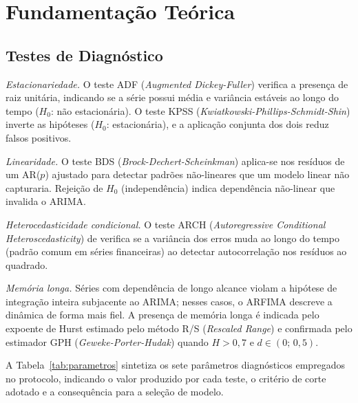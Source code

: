 \documentclass[12pt, a4paper]{article}
\begin{document}
\section{Fundamentação Teórica}

\subsection{Testes de Diagnóstico}

\textit{Estacionariedade.} O teste ADF (\textit{Augmented Dickey-Fuller})
\cite{said1984testing} verifica a presença de raiz unitária, indicando se a
série possui média e variância estáveis ao longo do tempo ($H_0$: não
estacionária). O teste KPSS (\textit{Kwiatkowski-Phillips-Schmidt-Shin})
\cite{kwiatkowski1992testing} inverte as hipóteses ($H_0$: estacionária), e
a aplicação conjunta dos dois reduz falsos positivos.

\textit{Linearidade.} O teste BDS (\textit{Brock-Dechert-Scheinkman})
\cite{broock1996test} aplica-se nos resíduos de um AR($p$) ajustado para
detectar padrões não-lineares que um modelo linear não capturaria. Rejeição
de $H_0$ (independência) indica dependência não-linear que invalida o ARIMA.

\textit{Heterocedasticidade condicional.} O teste ARCH
(\textit{Autoregressive Conditional Heteroscedasticity}) de
 verifica se a variância dos erros muda
ao longo do tempo (padrão comum em séries financeiras) ao detectar
autocorrelação nos resíduos ao quadrado.

\textit{Memória longa.} Séries com dependência de longo alcance violam
a hipótese de integração inteira subjacente ao ARIMA; nesses casos, o ARFIMA
descreve a dinâmica de forma mais fiel. A presença de memória longa é
indicada pelo expoente de Hurst \cite{hurst1951long-storage} estimado pelo
método R/S (\textit{Rescaled Range}) e confirmada pelo estimador GPH
(\textit{Geweke-Porter-Hudak}) \cite{geweke1983estimation} quando
$H > 0{,}7$ e $d \in (0;\, 0{,}5)$.

A Tabela~\ref{tab:parametros} sintetiza os sete parâmetros diagnósticos
empregados no protocolo, indicando o valor produzido por cada teste, o
critério de corte adotado e a consequência para a seleção de modelo.
\end{document}
